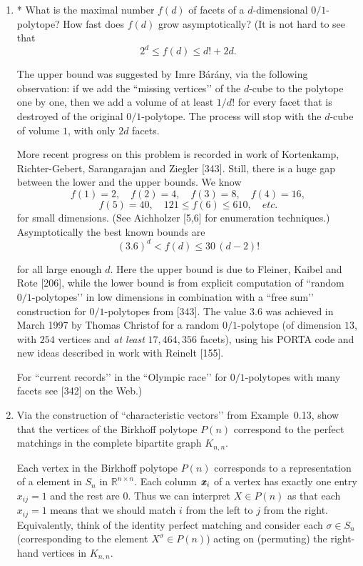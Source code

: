 \documentclass{article}
\begin{document}
\begin{enumerate}
\item * What is the maximal number $f(d)$ of facets of a $d$-dimensional $0/1$-polytope? How fast does $f(d)$ grow asymptotically?
(It is not hard to see that
\[2^{d} \le f(d) \le d! + 2d .\]

The upper bound was suggested by Imre Bárány, via the following observation: if we add the “missing vertices’’ of the $d$-cube to the polytope one by one, then we add a volume of at least $1/d!$ for every facet that is destroyed of the original $0/1$-polytope. The process will stop with the $d$-cube of volume $1$, with only $2d$ facets.

More recent progress on this problem is recorded in work of Kortenkamp, Richter-Gebert, Sarangarajan and Ziegler [343]. Still, there is a huge gap between the lower and the upper bounds. We know
\[f(1)=2,\quad f(2)=4,\quad f(3)=8,\quad f(4)=16,\]
\[f(5)=40,\quad 121 \le f(6) \le 610,\quad \textit{etc.}\]
for small dimensions. (See Aichholzer [5,6] for enumeration techniques.) Asymptotically the best known bounds are
\[(3.6)^{d} < f(d) \le 30\,(d-2)!\]

for all large enough $d$. Here the upper bound is due to Fleiner, Kaibel and Rote [206], while the lower bound is from explicit computation of “random $0/1$-polytopes’’ in low dimensions in combination with a “free sum’’ construction for $0/1$-polytopes from [343]. The value $3.6$ was achieved in March 1997 by Thomas Christof for a random $0/1$-polytope (of dimension $13$, with $254$ vertices and \textit{at least} $17{,}464{,}356$ facets), using his PORTA code and new ideas described in work with Reinelt [155]. 

For “current records’’ in the “Olympic race’’ for $0/1$-polytopes with many facets see [342] on the Web.)

\item Via the construction of “characteristic vectors’’ from Example~0.13, show that the vertices of the Birkhoff polytope $P(n)$ correspond to the perfect matchings in the complete bipartite graph $K_{n,n}$.

\begin{solution}
    Each vertex in the Birkhoff polytope $P(n)$ corresponds to a representation of a element in $S_n$ in $\mathbb{R}^{n \times n}$. Each column $\textbf{\textit{x}}_i$ of a vertex has exactly one entry $x_{ij} = 1$ and the rest are $0$. Thus we can interpret $X \in P(n)$ as that each $x_{ij} = 1$ means that we should match $i$ from the left to $j$ from the right. Equivalently, think of the identity perfect matching and consider each $\sigma \in S_n$ (corresponding to the element $X^\sigma \in P(n)$) acting on (permuting) the right-hand vertices in $K_{n,n}$. 
\end{solution}


\end{enumerate}
\end{document}
